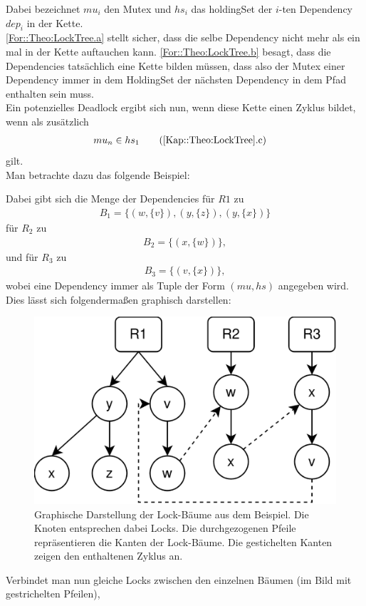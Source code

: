 Dabei bezeichnet $mu_i$ den Mutex und $hs_i$ das holdingSet der $i$-ten 
Dependency $dep_i$ in der Kette.\\
\eqref{For::Theo:LockTree.a} stellt sicher, dass die selbe 
Dependency nicht mehr als ein mal in der Kette auftauchen kann.  
\eqref{For::Theo:LockTree.b} besagt, dass die Dependencies tatsächlich
eine Kette bilden müssen, dass also der Mutex einer Dependency immer in dem 
HoldingSet der nächsten Dependency in dem Pfad enthalten sein muss. 
\\
Ein potenzielles Deadlock ergibt sich nun, wenn diese Kette einen Zyklus 
bildet, wenn als zusätzlich
\begin{align}
  &mu_n \in hs_{1} 
  \tag{\ref{Kap::Theo:LockTree}.c}
  \label{For::Theo:LockTree.c}
\end{align}
gilt.\\
Man betrachte dazu das folgende Beispiel:
\begin{figure}[H]
    
\end{figure}
Dabei gibt sich die Menge der Dependencies für $R1$ zu 
\begin{align*}
    B_1 = \{(w, \{v\}), (y, \{z\}), (y, \{x\})\}
\end{align*}
für $R_2$ zu 
\begin{align*}
    B_2 = \{(x, \{w\})\},
\end{align*}
und für $R_3$ zu 
\begin{align*}
    B_3 = \{(v, \{x\})\},
\end{align*} wobei eine Dependency immer als Tuple der Form $(mu, hs)$ angegeben 
wird. Dies lässt sich folgendermaßen graphisch darstellen:
\begin{figure}[H]
    \centering
    \includegraphics[width=.47\textwidth]{img/tree_example.eps}
    \caption{Graphische Darstellung der Lock-Bäume aus dem Beispiel. Die Knoten 
    entsprechen dabei Locks. Die durchgezogenen Pfeile repräsentieren die Kanten 
    der Lock-Bäume. Die gestichelten Kanten zeigen den enthaltenen Zyklus an.}
\end{figure}
Verbindet man nun 
gleiche Locks zwischen den einzelnen Bäumen (im Bild mit gestrichelten Pfeilen),
